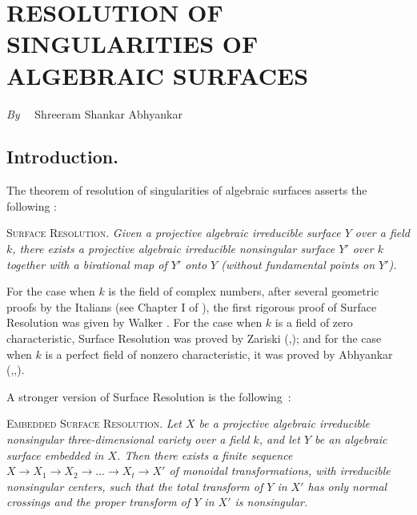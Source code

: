 \chapter[\textsc{S. S. Abhyankar} : Resolution of Singularities of Algebraic Surfaces]{RESOLUTION OF SINGULARITIES OF ALGEBRAIC SURFACES}

\begin{center}
{\em By}~~ Shreeram Shankar Abhyankar
\end{center}

\setcounter{pageoriginal}{0}
\section{Introduction.}\label{art01-sec1}
\pageoriginale 



The theorem of resolution of singularities of algebraic surfaces asserts the following :

\textsc{Surface Resolution.} {\em Given a projective algebraic irreducible surface $Y$ over a field $k$, there exists a projective algebraic irreducible nonsingular surface $Y'$ over $k$ together with a birational map of $Y'$ onto $Y$ (without fundamental points on $Y'$).}

For the case when $k$ is the field of complex numbers, after several geometric proofs by the Italians (see Chapter I of \cite{art01-key15}), the first rigorous proof of Surface Resolution was given by Walker \cite{art01-key14}. For the case when $k$ is a field of zero characteristic, Surface Resolution was proved by Zariski (\cite{art01-key16},\cite{art01-key17}); and for the case when $k$ is a perfect field of nonzero characteristic, it was proved by Abhyankar (\cite{art01-key2},\cite{art01-key3},\cite{art01-key4}).

A stronger version of Surface Resolution is the following~:

\medskip
\textsc{Embedded Surface Resolution.} {\em Let $X$ be a projective algebraic irreducible nonsingular three-dimensional variety over a field $k$, and let $Y$ be an algebraic surface embedded in $X$. Then there exists a finite sequence $X\to X_{1}\to X_{2}\to \ldots\to X_{t}\to X'$ of monoidal transformations, with irreducible nonsingular centers, such that the total transform of $Y$ in $X'$ has only normal crossings and the proper transform of $Y$ in $X'$ is nonsingular.}

